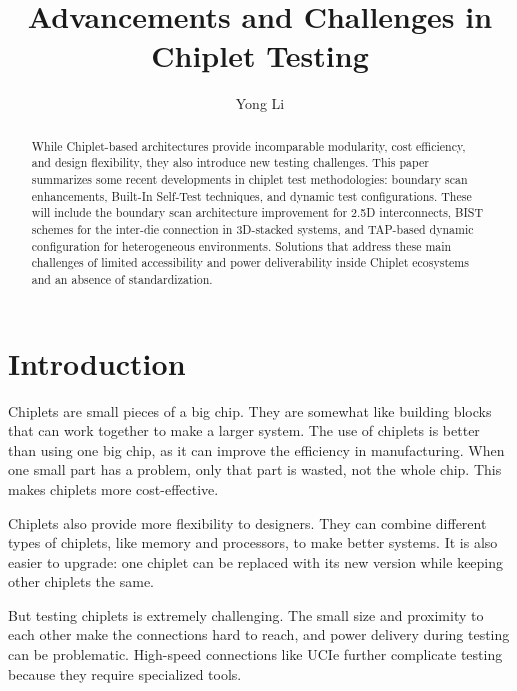 \documentclass[acmtog, 12pt]{acmart}
\begin{document}
\title{Advancements and Challenges in Chiplet Testing}

\author{Yong Li}



\begin{abstract}
  While Chiplet-based architectures provide incomparable modularity, cost efficiency, and design flexibility, they also introduce new testing challenges. This paper summarizes some recent developments in chiplet test methodologies: boundary scan enhancements, Built-In Self-Test techniques, and dynamic test configurations. These will include the boundary scan architecture improvement for 2.5D interconnects, BIST schemes for the inter-die connection in 3D-stacked systems, and TAP-based dynamic configuration for heterogeneous environments. Solutions that address these main challenges of limited accessibility and power deliverability inside Chiplet ecosystems and an absence of standardization.
  \end{abstract}
  
    
    
\maketitle


\section*{Introduction}


Chiplets are small pieces of a big chip. They are somewhat like building blocks that can work together to make a larger system. The use of chiplets is better than using one big chip, as it can improve the efficiency in manufacturing. When one small part has a problem, only that part is wasted, not the whole chip. This makes chiplets more cost-effective.

Chiplets also provide more flexibility to designers. They can combine different types of chiplets, like memory and processors, to make better systems. It is also easier to upgrade: one chiplet can be replaced with its new version while keeping other chiplets the same.

But testing chiplets is extremely challenging. The small size and proximity to each other make the connections hard to reach, and power delivery during testing can be problematic. High-speed connections like UCIe further complicate testing because they require specialized tools.
\end{document}
